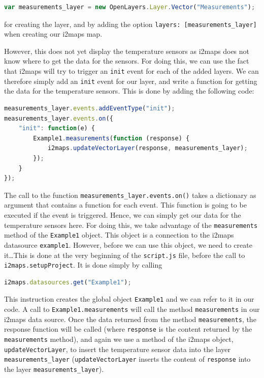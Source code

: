 \documentclass[11pt]{article}
\begin{document}
\begin{lstlisting}[language=JavaScript]
var measurements_layer = new OpenLayers.Layer.Vector("Measurements");
\end{lstlisting}

for creating the layer, and by adding the option \texttt{layers: [measurements\_layer]} when creating our i2maps map.

However, this does not yet display the temperature sensors as i2maps does not know where to get the data for the sensors. For doing this, we can use the fact that i2maps will try to trigger an \texttt{init} event for each of the added layers. We can therefore simply add an \texttt{init} event for our layer, and write a function for getting the data for the temperature sensors. This is done by adding the following code:

\begin{lstlisting}[language=JavaScript]
measurements_layer.events.addEventType("init");
measurements_layer.events.on({
    "init": function(e) {
        Example1.measurements(function (response) {
            i2maps.updateVectorLayer(response, measurements_layer);
        });
    }
});
\end{lstlisting}

The call to the function \texttt{measurements\_layer.events.on()} takes a dictionary as argument that contains a function for each event. This function is going to be executed if the event is triggered. Hence, we can simply get our data for the temperature sensors here. For doing this, we take advantage of the \texttt{measurements} method of the \texttt{Example1} object. This object is a connection to the i2maps datasource \texttt{example1}. However, before we can use this object, we need to create it\dots This is done at the very beginning of the \texttt{script.js} file, before the call to \texttt{i2maps.setupProject}. It is done simply by calling

\begin{lstlisting}[language=JavaScript]
i2maps.datasources.get("Example1");
\end{lstlisting}

This instruction creates the global object \texttt{Example1} and we can refer to it in our code. A call to \texttt{Example1.measurements} will call the method \texttt{measurements} in our i2maps data source. Once the data returned from the method \texttt{measurements}, the response function will be called (where \texttt{response} is the content returned by the \texttt{measurements} method), and again we use a method of the i2maps object, \texttt{updateVectorLayer}, to insert the temperature sensor data into the layer \texttt{measure\-ments\_\-layer} (\texttt{updateVectorLayer} inserts the content of \texttt{response} into the layer \texttt{measure\-ments\_\-layer}).
\end{document}
